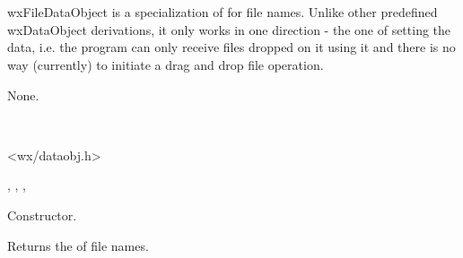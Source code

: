\section{}\label{wxfiledataobject}

wxFileDataObject is a specialization of  
for file names. Unlike other predefined wxDataObject derivations, it only works
in one direction - the one of setting the data, i.e. the program can only
receive files dropped on it using it and there is no way (currently) to
initiate a drag and drop file operation.


None.


\\


<wx/dataobj.h>


, 
, 
, 


\label{wxfiledataobjectwxfiledataobject}


Constructor.

\label{wxfiledataobjectgetfilenames}


Returns the  of file names.

